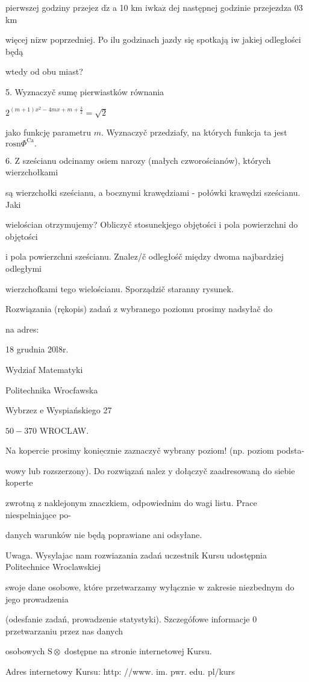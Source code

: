 \documentclass[a4paper,12pt]{article}
\begin{document}
pierwszej godziny przejez $\mathrm{d}\dot{\mathrm{z}}$ a 10 km $\mathrm{i}\mathrm{w}\mathrm{k}\mathrm{a}\dot{\mathrm{z}}$ dej następnej godzinie przejezdza $03$ km

więcej $\mathrm{n}\mathrm{i}\dot{\mathrm{z}}\mathrm{w}$ poprzedniej. Po ilu godzinach jazdy się spotkają $\mathrm{i}\mathrm{w}$ jakiej odległości będą

wtedy od obu miast?

5. Wyznaczyč sumę pierwiastków równania

$2^{(m+1)x^{2}-4mx+m+\frac{3}{2}}=\sqrt{2}$

jako funkcję parametru $m$. Wyznaczyč przedziafy, na których funkcja ta jest $\mathrm{r}\mathrm{o}\mathrm{s}\mathrm{n}\Phi^{\mathrm{C}\mathrm{a}}.$

6. $\mathrm{Z}$ sześcianu odcinamy osiem narozy (małych czworościanów), których wierzchołkami

są wierzchołki sześcianu, a bocznymi krawędziami - połówki krawędzi sześcianu. Jaki

wielościan otrzymujemy? Obliczyč stosunekjego objętości $\mathrm{i}$ pola powierzchni do objętości

$\mathrm{i}$ pola powierzchni sześcianu. Znalez/č odległośč między dwoma najbardziej odległymi

wierzchofkami tego wielościanu. Sporządzič staranny rysunek.

Rozwiązania (rękopis) zadań z wybranego poziomu prosimy nadsyłač do

na adres:

18 grudnia 20l8r.

Wydziaf Matematyki

Politechnika Wrocfawska

Wybrzez $\mathrm{e}$ Wyspiańskiego 27

$50-370$ WROCLAW.

Na kopercie prosimy $\underline{\mathrm{k}\mathrm{o}\mathrm{n}\mathrm{i}\mathrm{e}\mathrm{c}\mathrm{z}\mathrm{n}\mathrm{i}\mathrm{e}}$ zaznaczyč wybrany poziom! (np. poziom podsta-

wowy lub rozszerzony). Do rozwiązań nalez $\mathrm{y}$ dołączyč zaadresowaną do siebie koperte

zwrotną $\mathrm{z}$ naklejonym znaczkiem, odpowiednim do wagi listu. Prace niespelniające po-

danych warunków nie będą poprawiane ani odsyłane.

Uwaga. Wysylajac nam rozwiazania zadań uczestnik Kursu udostępnia Politechnice Wroclawskiej

swoje dane osobowe, które przetwarzamy wyłącznie $\mathrm{w}$ zakresie niezbednym do jego prowadzenia

(odesfanie zadań, prowadzenie statystyki). Szczegófowe informacje $0$ przetwarzaniu przez nas danych

osobowych $\mathrm{S}\otimes$ dostępne na stronie internetowej Kursu.

Adres internetowy Kursu: http: //www. im. pwr. edu. pl/kurs
\end{document}
